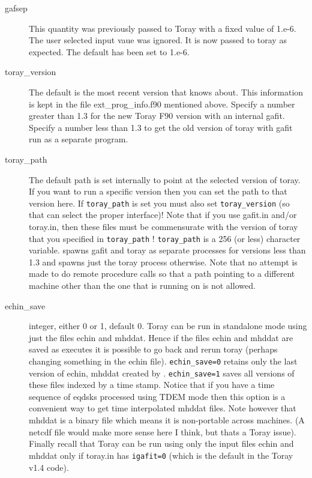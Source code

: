 \begin{description}
 \item[gafsep]  This quantity was previously passed to Toray with a fixed value
 of 1.e-6. The user selected input vaue was ignored. It is now passed to toray
 as expected. The default has been set to 1.e-6.
 \item[toray\_version]  The default is the  most recent version that \ot knows
 about. This information is kept in the file ext\_prog\_info.f90 mentioned
 above. Specify a number greater than 1.3 for the new Toray F90 version with an
 internal gafit. Specify a  number less than 1.3  to get the old version of
 toray with gafit run as a separate program.
 \item[toray\_path]  The default path is set internally to
 point at the selected version of toray. If you  want to run a
 specific version then you can set the path to that version
 here. If \texttt{toray\_path} is set you  must also set
 \texttt{toray\_version}  (so that \ot can select the proper interface)!
 Note that if you use gafit.in and/or toray.in, then these
 files must be commensurate with the version of toray
 that you specified in \texttt{toray\_path} !
 \texttt{toray\_path} is a 256 (or less) character variable.  \ot  spawns gafit
 and toray as separate processes for versions less than 1.3 and spawns just the
 toray process otherwise. Note that no attempt is made to do remote procedure
 calls so that a path pointing to a different machine other than the one that
 \ot is running on is not allowed. 
 \item[echin\_save]  integer, either 0 or 1, default 0. 
 Toray can be run in
 standalone mode using just the files echin and mhddat. Hence
 if the files echin and mhddat  are saved as \ot executes it is
 possible to go back and rerun toray (perhaps changing 
 something in the echin file). \texttt{echin\_save=0} retains only the
 last version of echin, mhddat created by \ot. \texttt{echin\_save=1} saves
 all versions of these files indexed by a time stamp. Notice
 that if you have a time sequence of eqdsks processed using
 TDEM  mode then this option is a convenient way to get time
 interpolated mhddat files. Note however that mhddat is a
 binary file which means it is non-portable across
 machines. (A netcdf file would make more sense here I think,
 but thats a Toray issue). Finally recall that
 Toray can be run using only the input files echin and mhddat
 only if toray.in has \texttt{igafit=0} (which is the default in the
 Toray v1.4  code).
\end{description}

